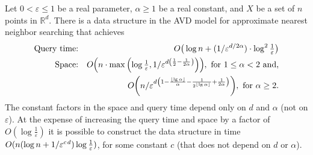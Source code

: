 \documentclass[11pt]{article}   \usepackage[letterpaper,hmargin=2.1cm,vmargin=3cm]{geometry}
\newcommand{\floor}[1]{\left\lfloor #1\right\rfloor}
\newcommand{\RE}{\mathbb{R}}    \newcommand{\ZZ}{\mathbb{Z}}    \newcommand{\eps}{\varepsilon}  \newcommand{\ST}{\,:\,}         \newcommand{\sq}{\square}
\newcommand{\OO}[1]{O\kern-2pt\left(#1\right)}  \newcommand{\half}[1]{\frac{#1}{2}}
\newcommand{\inv}[1]{\frac{1}{#1}}
\renewcommand{\P}{\kern+1pt}    \newcommand{\N}{\kern-2pt}      \newcommand{\NN}{\kern-4pt}     \newcommand{\polar}[1]{\mathrm{polar}(#1)}            \newcommand{\polarX}[2]{\mathrm{polar}_{#1}(#2)}
\begin{document}
\begin{lemma} \label{lem:ann-ub}
Let $0 < \eps \leq 1$ be a real parameter, $\alpha \geq 1$ be a real constant, and $X$ be a set of $n$ points in $\RE^d$. There is a data structure in the AVD model for approximate nearest neighbor searching that achieves
\begin{eqnarray*}
\text{Query time:} & & O\big(\log n + (1/\eps^{d/2 \alpha}) \cdot \log^2 {\textstyle \inv{\eps}}\big) \\
\text{Space:} & & 
  \OO{n \cdot \max\left(\log {\textstyle \inv{\eps}}, 1/\eps^{d\left(\inv{2} -\inv{2\alpha}\right)}\right)}\N , \text{~for $1 \leq \alpha < 2$ and,} \\
  & &
  \OO{n/\eps^{d \left(1 - \frac{\floor{\lg\alpha}}{\alpha} - \inv{2^{\floor{\lg \alpha}}} + \inv{2 \alpha}\right)}}\N , \text{~for $\alpha \geq 2$}.
\end{eqnarray*}
The constant factors in the space and query time depend only on $d$ and $\alpha$ (not on $\eps$). At the expense of increasing the query time and space by a factor of $O(\log \inv{\eps})$ it is possible to construct the data structure in time $O(n (\log n + 1/\eps^{c \P d}) \log\inv{\eps})$, for some constant $c$ (that does not depend on $d$ or $\alpha$).
\end{lemma}
\end{document}
